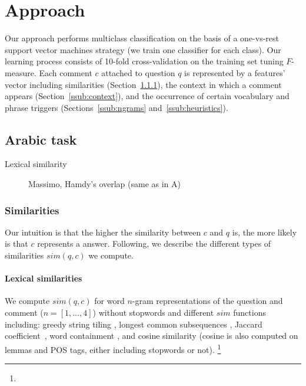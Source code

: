 \section{Approach}
\label{sec:approach}

Our approach performs multiclass classification on the basis of a one-vs-rest 
support vector machines strategy (\ie we train one classifier for each class). 
Our learning process consists of 10-fold cross-validation on the training set 
tuning $F$-measure. 
\blue{\ldots} 
Each comment $c$ attached to question $q$ is represented by a features' vector 
including similarities (Section~\ref{ssub:sim}), the context in which a comment 
appears (Section~\ref{ssub:context}), and the occurrence of certain vocabulary 
and phrase triggers (Sections~\ref{ssub:ngrams} and~\ref{ssub:heuristics}). 


\subsection{Arabic task}
\label{sub:app_arabic}

\begin{description}
 \item[Lexical similarity]  Massimo, Hamdy's overlap (same as in A) 
\end{description}


\subsubsection{Similarities}
\label{ssub:sim}

Our intuition is that the higher the similarity between $c$ and $q$ is, the 
more likely is that $c$ represents a \good answer. Following, we describe the 
different types of similarities $sim(q,c)$ we compute.

\paragraph{Lexical similarities}
We compute $sim(q, c)$ for word $n$-gram representations of the question and 
comment ($n=[1,\ldots,4]$) without stopwords and different $sim$ functions including: greedy 
string tiling \cite{Wise:1996}, longest common subsequences \cite{Allison:1986}, Jaccard 
coefficient~\cite{Jaccard:1901}, word containment \cite{Lyon:2001}, and cosine similarity 
(cosine is also computed on lemmas and POS tags, either including stopwords or 
not).%
\footnote{}


